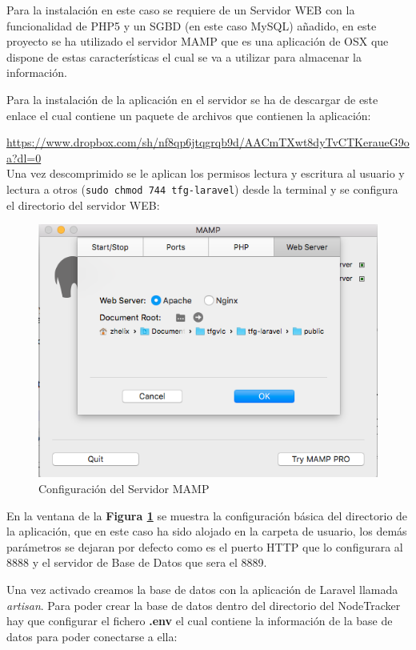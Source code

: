 Para la instalación en este caso se requiere de un Servidor WEB con la funcionalidad de PHP5 y un SGBD (en este caso MySQL) añadido, en este proyecto se ha utilizado el servidor MAMP que es una aplicación de OSX que dispone de estas características el cual se va a utilizar para almacenar la información.

Para la instalación de la aplicación en el servidor se ha de descargar de este enlace el cual contiene un paquete de archivos que contienen la aplicación: 

\url{https://www.dropbox.com/sh/nf8qp6jtqgrqb9d/AACmTXwt8dyTvCTKeraueG9oa?dl=0}\\

Una vez descomprimido se le aplican los permisos lectura y escritura al usuario y lectura a otros (\texttt{sudo chmod 744 tfg-laravel}) desde la terminal y se configura el directorio del servidor WEB:

\begin{figure}[!h]
	\centering
	\includegraphics[width=0.7\linewidth]{figuras/confmamp}
	\caption{Configuración del Servidor MAMP}
	\label{fig:confmamp}
\end{figure}

En la ventana de la \textbf{Figura \ref{fig:confmamp}} se muestra la configuración básica del directorio de la aplicación, que en este caso ha sido alojado en la carpeta de usuario, los demás parámetros se dejaran por defecto como es el puerto HTTP que lo configurara al 8888 y el servidor de Base de Datos que sera el 8889.

Una vez activado creamos la base de datos con la aplicación de Laravel llamada \textit{artisan}. Para poder crear la base de datos dentro del directorio del NodeTracker hay que configurar el fichero \textbf{.env} el cual contiene la información de la base de datos para poder conectarse a ella:

